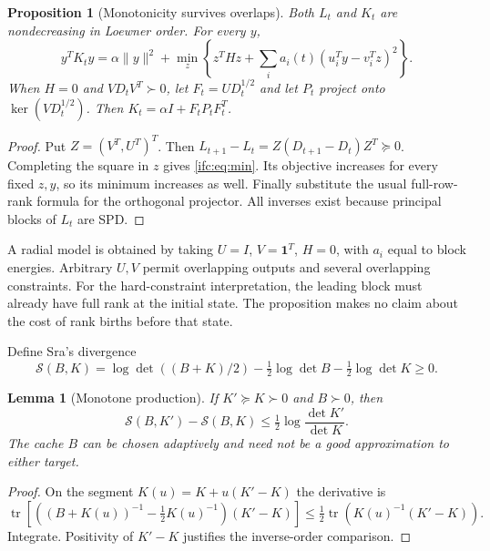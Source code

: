 \documentclass[11pt]{amsart}
\newtheorem{lemma}[theorem]{Lemma}
\newtheorem{proposition}[theorem]{Proposition}
\theoremstyle{definition}\newtheorem{definition}[theorem]{Definition}
\theoremstyle{remark}\newtheorem{remark}[theorem]{Remark}
\numberwithin{equation}{section}
\newcommand{\tr}{\operatorname{tr}}
\newcommand{\Sc}{\mathcal S}
\begin{document}
\begin{proposition}[Monotonicity survives overlaps]\label{ifc:prop:mono}
Both $L_t$ and $K_t$ are nondecreasing in Loewner order. For every $y$,
\begin{equation}\label{ifc:eq:min}
 y^TK_ty=\alpha\|y\|^2+
 \min_z\left\{z^THz+
       \sum_i a_i(t)(u_i^Ty-v_i^Tz)^2\right\}.
\end{equation}
When $H=0$ and $VD_tV^T\succ0$, let
$F_t=UD_t^{1/2}$ and let $P_t$ project onto
$\ker(VD_t^{1/2})$. Then $K_t=\alpha I+F_tP_tF_t^T$.
\end{proposition}
\begin{proof}
Put $Z=(V^T,U^T)^T$. Then
$L_{t+1}-L_t=Z(D_{t+1}-D_t)Z^T\succeq0$.
Completing the square in $z$ gives \eqref{ifc:eq:min}. Its objective
increases for every fixed $z,y$, so its minimum increases as well.
Finally substitute the usual full-row-rank formula for the orthogonal
projector. All inverses exist because principal blocks of $L_t$ are SPD.
\end{proof}

A radial model is obtained by taking $U=I$, $V=\mathbf1^T$,
$H=0$, with $a_i$ equal to block energies. Arbitrary $U,V$ permit
overlapping outputs and several overlapping constraints. For the
hard-constraint interpretation, the leading block must already have
full rank at the initial state. The proposition makes no claim about
the cost of rank births before that state.

Define Sra's divergence
\[
 \Sc(B,K)=\log\det((B+K)/2)
             -\tfrac12\log\det B-\tfrac12\log\det K\ge0.
\]
\begin{lemma}[Monotone production]\label{ifc:lem:production}
If $K'\succeq K\succ0$ and $B\succ0$, then
\begin{equation}\label{ifc:eq:production}
 \Sc(B,K')-\Sc(B,K)
 \le\tfrac12\log\frac{\det K'}{\det K}.
\end{equation}
The cache $B$ can be chosen adaptively and need not be a good
approximation to either target.
\end{lemma}
\begin{proof}
On the segment $K(u)=K+u(K'-K)$ the derivative is
\[
 \tr\left[((B+K(u))^{-1}-\tfrac12K(u)^{-1})(K'-K)\right]
 \le\tfrac12\tr(K(u)^{-1}(K'-K)).
\]
Integrate. Positivity of $K'-K$ justifies the inverse-order comparison.
\end{proof}
\end{document}
